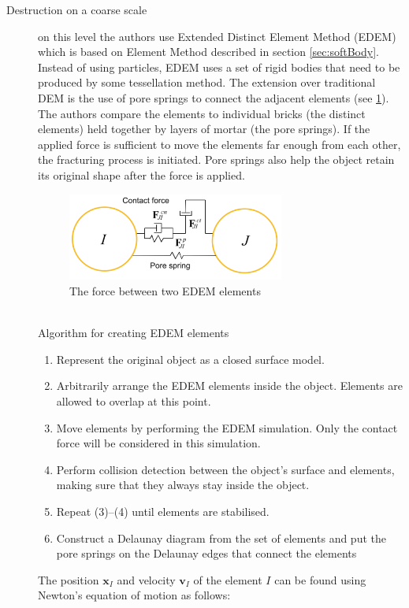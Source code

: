 \begin{description}
\item[Destruction on a coarse scale] on this level the authors use Extended Distinct Element Method (EDEM) which is based on Element Method described in section \ref{sec:softBody}. Instead of using particles, EDEM uses a set of rigid bodies that need to be produced by some tessellation method. The extension over traditional DEM is the use of pore springs to connect the adjacent elements (see \cref{fig:spring}). The authors compare the elements to individual bricks (the distinct elements) held together by layers of mortar (the pore springs). If the applied force is sufficient to move the elements far enough from each other, the fracturing process is initiated. Pore springs also help the object retain its original shape after the force is applied. %
\begin{figure}[t] %
        \centering
        \includegraphics[width=0.7\textwidth]{img/spring}
        \caption{The force between two EDEM elements \cite{edem}}
        \label{fig:spring}
\end{figure}
\\Algorithm for creating EDEM elements
\begin{enumerate}
\item Represent the original object as a closed surface model.
\item Arbitrarily arrange the EDEM elements inside the object.
Elements are allowed to overlap at this point.
\item Move elements by performing the EDEM simulation. Only the contact force will be considered in this simulation.
\item Perform collision detection between the object’s surface
and elements, making sure that they always
stay inside the object.
\item Repeat (3)–(4) until elements are stabilised.
\item Construct a Delaunay diagram from the set of elements
and put the pore springs on the Delaunay edges that connect
the elements
\end{enumerate}
The position $\mathbf{x}_I$ and velocity $\mathbf{v}_I$ of the element $\mathit{I}$ can be found using Newton’s equation of motion as follows:
 

\end{description}
